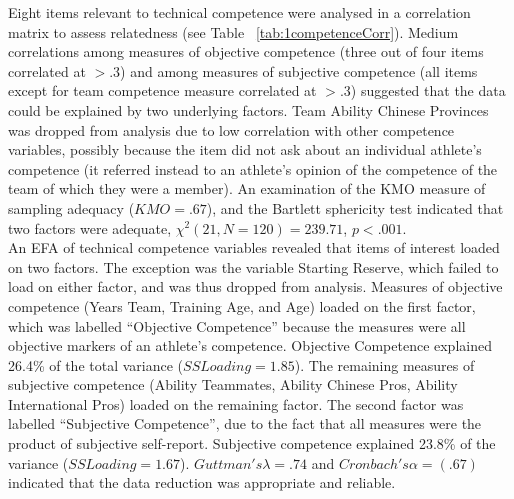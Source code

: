 Eight items relevant to technical competence were analysed in a correlation matrix to assess relatedness (see Table ~\ref{tab:1competenceCorr}). Medium correlations among measures of objective competence (three out of four items correlated at $> .3$) and among measures of subjective competence (all items except for team competence measure correlated at $> .3$) suggested that the data could be explained by two underlying factors. Team Ability Chinese Provinces was dropped from analysis due to low correlation with other competence variables, possibly because the item did not ask about an individual athlete’s competence (it referred instead to an athlete’s opinion of the competence of the team of which they were a member). An examination of the KMO measure of sampling adequacy ($KMO = .67$), and the Bartlett sphericity test indicated that two factors were adequate, $\chi^2(21, N = 120) = 239.71$, $p < .001$. \\

An EFA of technical competence variables revealed that items of interest loaded on two factors. The exception was the variable Starting Reserve, which failed to load on either factor, and was thus dropped from analysis. Measures of objective competence (Years Team, Training Age, and Age) loaded on the first factor, which was labelled ``Objective Competence'' because the measures were all objective markers of an athlete's competence.  Objective Competence explained 26.4\% of the total variance ($SS Loading = 1.85$). The remaining measures of subjective competence (Ability Teammates, Ability Chinese Pros, Ability International Pros) loaded on the remaining factor.  The second factor was labelled ``Subjective Competence'', due to the fact that all measures were the product of subjective self-report.  Subjective competence explained 23.8\% of the variance ($SS Loading = 1.67$). $Guttman's \lambda =.74$ and $Cronbach's \alpha = (.67)$ indicated that the data reduction was appropriate and reliable.





























